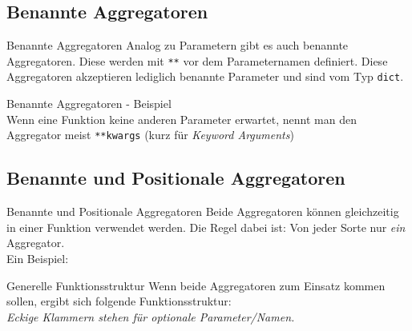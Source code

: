 \subsection{Benannte Aggregatoren}
\begin{frame}[fragile]{Benannte Aggregatoren}
  Analog zu Parametern gibt es auch benannte Aggregatoren. Diese werden mit \texttt{**}
  vor dem Parameternamen definiert. Diese Aggregatoren akzeptieren lediglich
  benannte Parameter und sind vom Typ \texttt{dict}.
\end{frame}

\begin{frame}[fragile]{Benannte Aggregatoren - Beispiel}
   \ \\[.75cm]
  Wenn eine Funktion keine anderen Parameter erwartet, nennt man den Aggregator meist
  \texttt{**kwargs} (kurz für \textit{Keyword Arguments})
\end{frame}


\subsection{Benannte und Positionale Aggregatoren}
\begin{frame}{Benannte und Positionale Aggregatoren}
  Beide Aggregatoren können gleichzeitig in einer Funktion verwendet werden.
  Die Regel dabei ist: Von jeder Sorte nur \textit{ein} Aggregator. \\[.5cm]
  Ein Beispiel:
  
\end{frame}

\begin{frame}{Generelle Funktionsstruktur}
  Wenn beide Aggregatoren zum Einsatz kommen sollen, ergibt sich folgende Funktionsstruktur: \\[.25cm]
  
  \textit{Eckige Klammern stehen für optionale Parameter/Namen.}
\end{frame}


